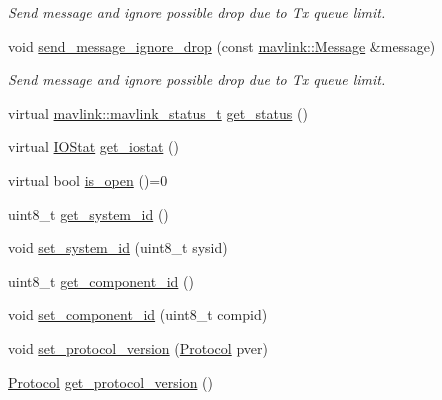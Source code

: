 \begin{DoxyCompactItemize}
\begin{DoxyCompactList}\small\item\em Send message and ignore possible drop due to Tx queue limit. \end{DoxyCompactList}\item 
void \mbox{\hyperlink{group__mavconn_gaafdea305c3cd449ac629f84598febbe0}{send\+\_\+message\+\_\+ignore\+\_\+drop}} (const \mbox{\hyperlink{structmavlink_1_1Message}{mavlink\+::\+Message}} \&message)
\begin{DoxyCompactList}\small\item\em Send message and ignore possible drop due to Tx queue limit. \end{DoxyCompactList}\item 
virtual \mbox{\hyperlink{include__v2_80_2mavlink__types_8h_aec6f7af3879252822d8fb108e97aafc2}{mavlink\+::mavlink\+\_\+status\+\_\+t}} \mbox{\hyperlink{group__mavconn_gaa3c7017b05ca60187122edf2ec196918}{get\+\_\+status}} ()
\item 
virtual \mbox{\hyperlink{structmavconn_1_1MAVConnInterface_1_1IOStat}{I\+O\+Stat}} \mbox{\hyperlink{group__mavconn_gab330e130b5cff0e1d6aa67742ffc79f4}{get\+\_\+iostat}} ()
\item 
virtual bool \mbox{\hyperlink{group__mavconn_ga135638c7c953c50bee3143a9e2b35416}{is\+\_\+open}} ()=0
\item 
uint8\+\_\+t \mbox{\hyperlink{group__mavconn_gac09eda5df4b4b82823429d9af6dddd44}{get\+\_\+system\+\_\+id}} ()
\item 
void \mbox{\hyperlink{group__mavconn_gaf2828d99a65c8e631566e7fd564abac3}{set\+\_\+system\+\_\+id}} (uint8\+\_\+t sysid)
\item 
uint8\+\_\+t \mbox{\hyperlink{group__mavconn_gada7ecc7f6cffa0ecfc17f88327953223}{get\+\_\+component\+\_\+id}} ()
\item 
void \mbox{\hyperlink{group__mavconn_gac3e7c34cdb6e8104959654ff49bd2497}{set\+\_\+component\+\_\+id}} (uint8\+\_\+t compid)
\item 
void \mbox{\hyperlink{group__mavconn_gae78b30f23f5f1a94684761f7ddc0d2e2}{set\+\_\+protocol\+\_\+version}} (\mbox{\hyperlink{group__mavconn_gae4e5498ebfd232dcad75be0f8a168ff3}{Protocol}} pver)
\item 
\mbox{\hyperlink{group__mavconn_gae4e5498ebfd232dcad75be0f8a168ff3}{Protocol}} \mbox{\hyperlink{group__mavconn_gaae320aaf19ca5b0c03b6febba5efdf1b}{get\+\_\+protocol\+\_\+version}} ()
\end{DoxyCompactItemize}
